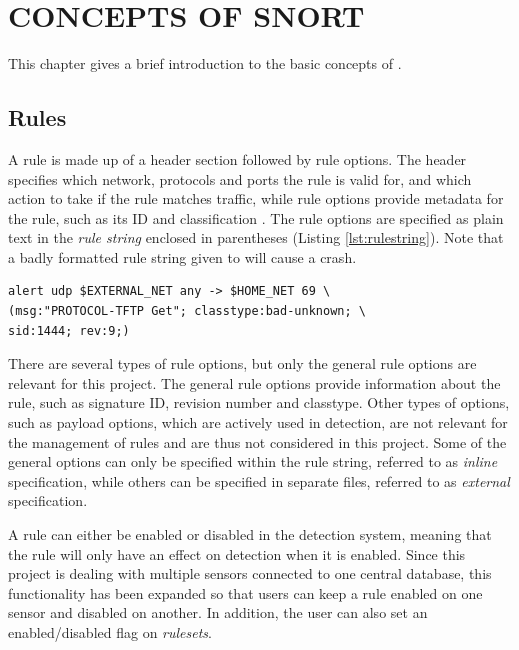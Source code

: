 \chapter{CONCEPTS OF SNORT}
\label{chap:concepts_of_snort}

This chapter gives a brief introduction to the basic concepts of \snort{}.

\section{Rules}

A \snort{} rule is made up of a header section followed by rule options. The
header specifies which network, protocols and ports the rule is valid for, and
which action to take if the rule matches traffic, while rule options provide
metadata for the rule, such as its ID and classification \cite{SnortManual}. The
rule options are specified as plain text in the {\em rule string} enclosed in
parentheses (Listing \ref{lst:rulestring}). Note that a badly formatted
rule string given to \snort{} will cause a crash.


\begin{lstlisting}[frame=single, caption=Example rule string.,
label=lst:rulestring,captionpos=b]
alert udp $EXTERNAL_NET any -> $HOME_NET 69 \
(msg:"PROTOCOL-TFTP Get"; classtype:bad-unknown; \
sid:1444; rev:9;)
\end{lstlisting}
There are several types of rule options, but only the general rule options are
relevant for this project. The general rule options provide information about
the rule, such as signature ID, revision number and classtype.
Other types of options, such as payload options, which are actively used in
detection, are not relevant for the management of rules and are thus not considered in this
project. Some of the general options can only be specified within the
rule string, referred to as {\em inline} specification, while others can be
specified in separate files, referred to as {\em external} specification.

A rule can either be enabled or disabled in the detection system, meaning that
the rule will only have an effect on detection when it is enabled. Since this
project is dealing with multiple sensors connected to one central database, this
functionality has been expanded so that users can keep a rule enabled on one
sensor and disabled on another. In addition, the user can also set an
enabled/disabled flag on \textit{rulesets}.

